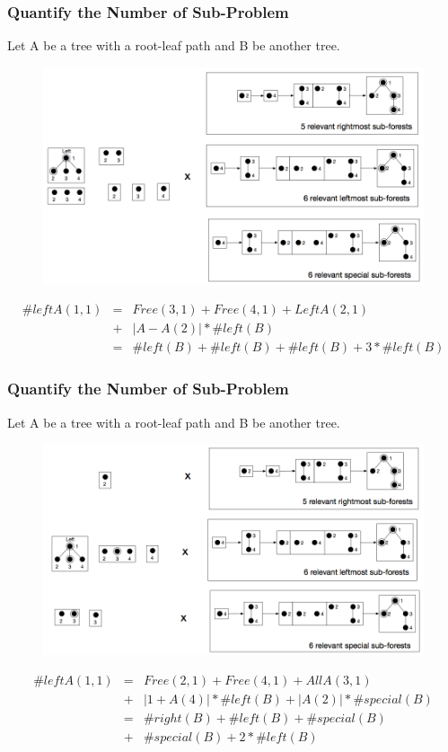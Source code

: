 \documentclass{beamer}
\begin{document}
\begin{frame}
\frametitle{Quantify the Number of Sub-Problem}
Let A be a tree with a root-leaf path and B be another tree.
\begin{figure}
	\includegraphics[width=0.7\linewidth]{leftleft}
	\centering
\end{figure}
\begin{eqnarray*}
\#leftA(1, 1) &=& Free(3, 1) + Free(4, 1) + LeftA(2, 1)\\
&+& \left\vert A - A(2) \right\vert * \#left(B) \\
&=& \#left(B) + \#left(B) + \#left(B) + 3 * \#left(B)
\end{eqnarray*}
\end{frame}
\begin{frame}
\frametitle{Quantify the Number of Sub-Problem}
Let A be a tree with a root-leaf path and B be another tree.
\begin{figure}
	\includegraphics[width=0.7\linewidth]{leftmid}
	\centering
\end{figure}
\begin{eqnarray*}
\#leftA(1, 1) &=& Free(2, 1) + Free(4, 1) + AllA(3, 1)\\
&+& \left\vert 1 + A(4) \right\vert * \#left(B) + \left\vert A(2) \right\vert * \#special(B) \\
&=& \#right(B) + \#left(B) + \#special(B)\\
&+&  \#special(B) + 2 * \#left(B)
\end{eqnarray*}
\end{frame}
\end{document}
